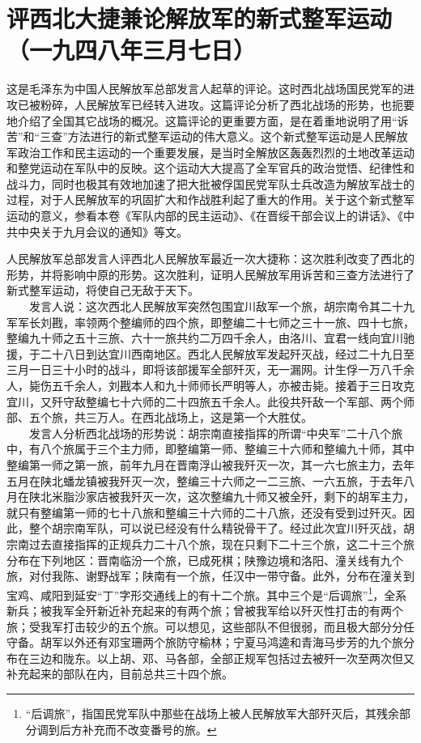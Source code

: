 \documentclass[cn,11pt,chinese]{elegantbook}
\def\myformat#1{\hfil\hfil #1}
\begin{document}
\newpage\section*{\myformat{评西北大捷兼论解放军的新式整军运动}\\\myformat{（一九四八年三月七日）}}
\begin{introduction}\item  这是毛泽东为中国人民解放军总部发言人起草的评论。这时西北战场国民党军的进攻已被粉碎，人民解放军已经转入进攻。这篇评论分析了西北战场的形势，也扼要地介绍了全国其它战场的概况。这篇评论的更重要方面，是在着重地说明了用“诉苦”和“三查”方法进行的新式整军运动的伟大意义。这个新式整军运动是人民解放军政治工作和民主运动的一个重要发展，是当时全解放区轰轰烈烈的土地改革运动和整党运动在军队中的反映。这个运动大大提高了全军官兵的政治觉悟、纪律性和战斗力，同时也极其有效地加速了把大批被俘国民党军队士兵改造为解放军战士的过程，对于人民解放军的巩固扩大和作战胜利起了重大的作用。关于这个新式整军运动的意义，参看本卷《军队内部的民主运动》、《在晋绥干部会议上的讲话》、《中共中央关于九月会议的通知》等文。\end{introduction}
人民解放军总部发言人评西北人民解放军最近一次大捷称：这次胜利改变了西北的形势，并将影响中原的形势。这次胜利，证明人民解放军用诉苦和三查方法进行了新式整军运动，将使自己无敌于天下。\\
　　发言人说：这次西北人民解放军突然包围宜川敌军一个旅，胡宗南令其二十九军军长刘戡，率领两个整编师的四个旅，即整编二十七师之三十一旅、四十七旅，整编九十师之五十三旅、六十一旅共约二万四千余人，由洛川、宜君一线向宜川驰援，于二十八日到达宜川西南地区。西北人民解放军发起歼灭战，经过二十九日至三月一日三十小时的战斗，即将该部援军全部歼灭，无一漏网。计生俘一万八千余人，毙伤五千余人，刘戡本人和九十师师长严明等人，亦被击毙。接着于三日攻克宜川，又歼守敌整编七十六师的二十四旅五千余人。此役共歼敌一个军部、两个师部、五个旅，共三万人。在西北战场上，这是第一个大胜仗。\\
　　发言人分析西北战场的形势说：胡宗南直接指挥的所谓“中央军”二十八个旅中，有八个旅属于三个主力师，即整编第一师、整编三十六师和整编九十师，其中整编第一师之第一旅，前年九月在晋南浮山被我歼灭一次，其一六七旅主力，去年五月在陕北蟠龙镇被我歼灭一次，整编三十六师之一二三旅、一六五旅，于去年八月在陕北米脂沙家店被我歼灭一次，这次整编九十师又被全歼，剩下的胡军主力，就只有整编第一师的七十八旅和整编三十六师的二十八旅，还没有受到过歼灭。因此，整个胡宗南军队，可以说已经没有什么精锐骨干了。经过此次宜川歼灭战，胡宗南过去直接指挥的正规兵力二十八个旅，现在只剩下二十三个旅，这二十三个旅分布在下列地区：晋南临汾一个旅，已成死棋；陕豫边境和洛阳、潼关线有九个旅，对付我陈、谢野战军；陕南有一个旅，任汉中一带守备。此外，分布在潼关到宝鸡、咸阳到延安“丁”字形交通线上的有十二个旅。其中三个是“后调旅”\footnote[1]{ “后调旅”，指国民党军队中那些在战场上被人民解放军大部歼灭后，其残余部分调到后方补充而不改变番号的旅。}，全系新兵；被我军全歼新近补充起来的有两个旅；曾被我军给以歼灭性打击的有两个旅；受我军打击较少的五个旅。可以想见，这些部队不但很弱，而且极大部分分任守备。胡军以外还有邓宝珊两个旅防守榆林；宁夏马鸿逵和青海马步芳的九个旅分布在三边和陇东。以上胡、邓、马各部，全部正规军包括过去被歼一次至两次但又补充起来的部队在内，目前总共三十四个旅。\\
\end{document}
